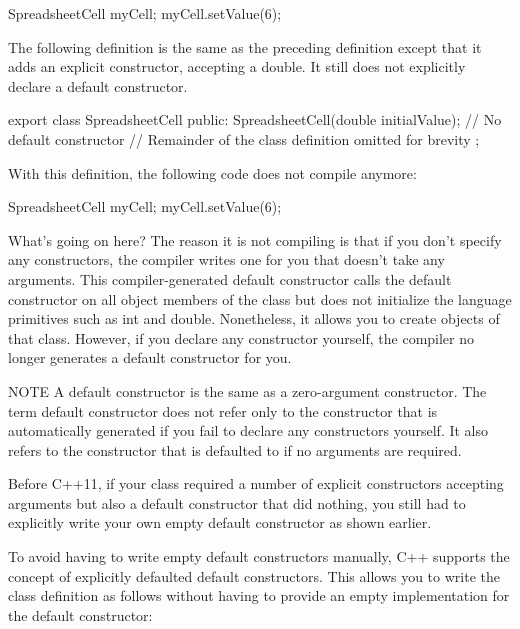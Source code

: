 \begin{cpp}
SpreadsheetCell myCell;
myCell.setValue(6);
\end{cpp}

The following definition is the same as the preceding definition except that it adds an explicit constructor, accepting a double. It still does not explicitly declare a default constructor.

\begin{cpp}
export class SpreadsheetCell
{
    public:
        SpreadsheetCell(double initialValue); // No default constructor
        // Remainder of the class definition omitted for brevity
};
\end{cpp}

With this definition, the following code does not compile anymore:

\begin{cpp}
SpreadsheetCell myCell;
myCell.setValue(6);
\end{cpp}

What’s going on here? The reason it is not compiling is that if you don’t specify any constructors, the compiler writes one for you that doesn’t take any arguments. This compiler-generated default constructor calls the default constructor on all object members of the class but does not initialize the language primitives such as int and double. Nonetheless, it allows you to create objects of that class. However, if you declare any constructor yourself, the compiler no longer generates a default constructor for you.

\begin{myNotic}{NOTE}
A default constructor is the same as a zero-argument constructor. The term default constructor does not refer only to the constructor that is automatically generated if you fail to declare any constructors yourself. It also refers to the constructor that is defaulted to if no arguments are required.
\end{myNotic}


Before C++11, if your class required a number of explicit constructors accepting arguments but also a default constructor that did nothing, you still had to explicitly write your own empty default constructor as shown earlier.

To avoid having to write empty default constructors manually, C++ supports the concept of explicitly defaulted default constructors. This allows you to write the class definition as follows without having to provide an empty implementation for the default constructor:

